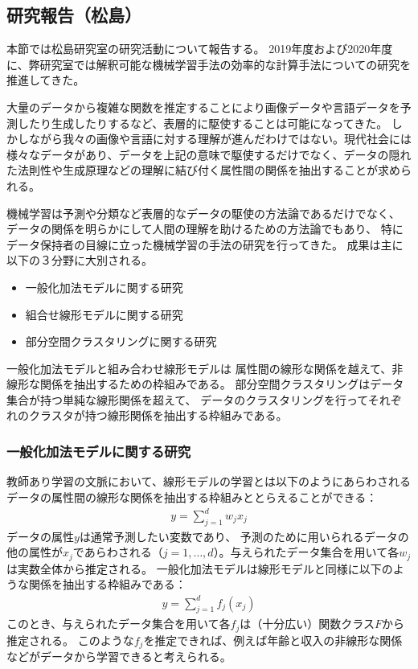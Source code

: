 \subsection{研究報告（松島）}
本節では松島研究室の研究活動について報告する。
2019年度および2020年度に、弊研究室では解釈可能な機械学習手法の効率的な計算手法についての研究を推進してきた。

大量のデータから複雑な関数を推定することにより画像データや言語データを予測したり生成したりするなど、表層的に駆使することは可能になってきた。
しかしながら我々の画像や言語に対する理解が進んだわけではない。現代社会には様々なデータがあり、データを上記の意味で駆使するだけでなく、データの隠れた法則性や生成原理などの理解に結び付く属性間の関係を抽出することが求められる。

機械学習は予測や分類など表層的なデータの駆使の方法論であるだけでなく、
データの関係を明らかにして人間の理解を助けるための方法論でもあり、
特にデータ保持者の目線に立った機械学習の手法の研究を行ってきた。
成果は主に以下の３分野に大別される。
\begin{itemize}
    \item 一般化加法モデルに関する研究
    \item 組合せ線形モデルに関する研究
    \item 部分空間クラスタリングに関する研究
\end{itemize}

一般化加法モデルと組み合わせ線形モデルは
属性間の線形な関係を越えて、非線形な関係を抽出するための枠組みである。
部分空間クラスタリングはデータ集合が持つ単純な線形関係を超えて、
データのクラスタリングを行ってそれぞれのクラスタが持つ線形関係を抽出する枠組みである。


\subsubsection{一般化加法モデルに関する研究}
教師あり学習の文脈において、線形モデルの学習とは以下のようにあらわされるデータの属性間の線形な関係を抽出する枠組みととらえることができる：
\begin{align*}
    y = \sum_{j=1}^d w_j x_j
\end{align*}
データの属性$y$は通常予測したい変数であり、
予測のために用いられるデータの他の属性が$x_j$であらわされる（$j=1,\ldots,d$）。与えられたデータ集合を用いて各$w_j$は実数全体から推定される。
一般化加法モデル\cite{F}は線形モデルと同様に以下のような関係を抽出する枠組みである：
\begin{align*}
    y = \sum_{j=1}^d f_j (x_j)
\end{align*}
このとき、与えられたデータ集合を用いて各$f_j$は（十分広い）関数クラス$F$から推定される。
このような$f_j$を推定できれば、例えば年齢と収入の非線形な関係などがデータから学習できると考えられる。

